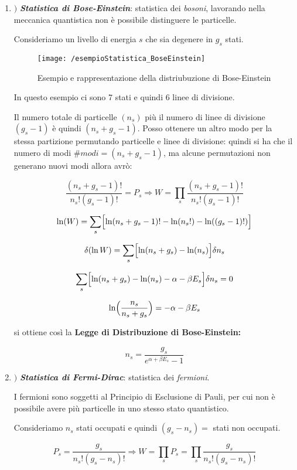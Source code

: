 \begin{enumerate}[label=\Roman*]
\item  $\Bigr)$
\emph{\textbf{Statistica di Bose-Einstein}}: statistica dei \textit{bosoni}, lavorando nella meccanica quantistica non è possibile distinguere le particelle.

Consideriamo un livello di energia $s$ che sia degenere in $g_s$ stati.

\begin{figure}[h]
\centering
\texttt{[image: /esempioStatistica\_BoseEinstein]}
\caption{Esempio e rappresentazione della distriubuzione di Bose-Einstein}
\end{figure}

In questo esempio ci sono 7 stati e quindi 6 linee di divisione.

Il numero totale di particelle $(n_s)$ più il numero di linee di divisione $(g_s - 1)$ è quindi $(n_s + g_s - 1)$.
Posso ottenere un altro modo per la stessa partizione permutando particelle e linee di divisione:
quindi si ha che il numero di modi $\# modi = ( n_s + g_s - 1 )$, ma alcune permutazioni non generano nuovi modi allora avrò:

$$ \frac{(n_s + g_s - 1)!}{n_s! (g_s -1)! } = P_s   \Rightarrow W = \prod_s \frac{(n_s + g_s -1)! }{ n_s! (g_s - 1)! }$$

$$ \ln(W) = \sum_s \Bigl[  \ln(n_s + g_s - 1)! - \ln(n_s !) - \ln(( g_s - 1 )! )  \Bigr] $$

$$ \delta (\ln W ) = \sum_s \Bigl[  \ln ( n_s + g_s ) - \ln ( n_s )  \Bigr] \delta n_s  $$

$$ \sum_s \Bigl[  \ln ( n_s + g_s ) - \ln ( n_s )  - \alpha - \beta E_s \Bigr] \delta n_s = 0 $$

$$ \ln \Bigl(  \frac{n_s}{n_s + g_s}  \Bigr) = - \alpha - \beta E_s $$

si ottiene così la \textbf{Legge di Distribuzione di Bose-Einstein:}

$$ n_s = \frac{g_s}{ e^{\alpha + \beta E_s} - 1 } $$



\item $\Bigr)$
\emph{\textbf{Statistica di Fermi-Dirac}}: statistica dei \textit{fermioni}.

I fermioni sono soggetti al Principio di Esclusione di Pauli, per cui non è possibile avere più particelle in uno stesso stato quantistico.

Consideriamo $n_s$ stati occupati e quindi $(g_s - n_s) = $ stati non occupati.

$$ P_s = \frac{g_s}{n_s! (g_s - n_s)!}  \Rightarrow W = \prod_s P_s = \prod_s \frac{g_s}{n_s! (g_s - n_s)!} $$


\end{enumerate}
